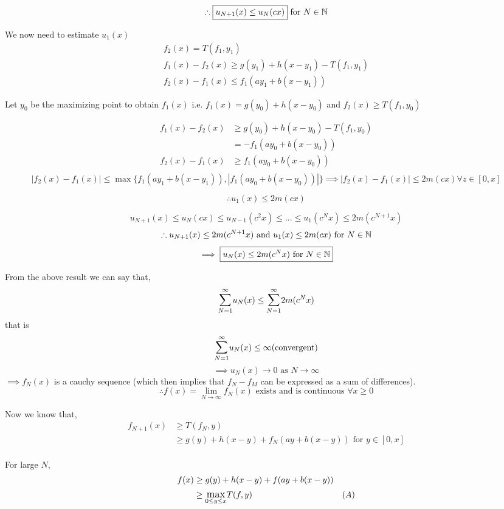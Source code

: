 $$
\therefore \boxed{u_{N+1}(x) \le u_N(cx)} \text{ for } N \in \mathbb{N} 
$$

We now need to estimate $u_1(x)$
\begin{align*}
    f_2(x) = T(f_1, y_1)\\
    f_1(x) - f_2(x) \ge g(y_1) + h(x-y_1) - T(f_1, y_1)\\
    f_2(x) - f_1(x) \le f_1(ay_1 +  b(x-y_1))
\end{align*}

Let $y_0$ be the maximizing point to obtain $f_1(x)$ i.e. $f_1(x) = g(y_0) + h(x-y_0)$ and $f_2(x) \ge T(f_1, y_0)$

\begin{align*}
    f_1(x) - f_2(x) &\ge g(y_0) + h(x-y_0) - T(f_1, y_0)\\
                    &= -f_1(ay_0 +  b(x-y_0))\\
    f_2(x) - f_1(x) &\ge f_1(ay_0 +  b(x-y_0))\\
\end{align*}
\[
    |f_2(x) - f_1(x)| \le \max\{f_1(ay_1 +  b(x-y_1)), |f_1(ay_0 +  b(x-y_0))|\} \implies
    |f_2(x) - f_1(x)| \le 2m(cx) \forall z \in [0, x]
\]

$$\therefore \boxed{u_1(x) \le 2m(cx)}$$

$$
u_{N+1}(x) \le u_N(cx) \le u_{N-1}(c^2x) \le ... \le u_1(c^Nx) \le 2m(c^{N+1}x)
$$
$$
\therefore {u_{N+1}(x) \le 2m(c^{N+1}x) \text{ and } u_1(x) \le 2m(cx)} \text{ for } N \in \mathbb{N}
$$
$$
\implies \boxed{u_N(x) \le 2m(c^{N}x) \text{ for } N \in \mathbb{N}}
$$

From the above result we can say that, 
$$
\bigsum_{N=1}^{\infty} u_N(x) \le \bigsum_{N=1}^{\infty} 2m(c^{N}x)
$$
that is 
$$
\bigsum_{N=1}^{\infty} u_N(x) \le \infty \text{(convergent)}
$$
$$
\implies u_N(x) \rightarrow 0 \text{ as } N \rightarrow \infty
$$
$\implies f_N(x)$ is a cauchy sequence (which then implies that $f_N-f_M$ can be expressed as a sum of differences).
$$
\therefore f(x) = \lim_{N \rightarrow \infty} f_N(x) \text{ exists and is continuous } \forall x \ge 0
$$

\vspace{5mm}

Now we know that, 
\begin{align*}
    f_{N+1}(x) &\ge T(f_N, y)\\
               &\ge g(y) + h(x-y) + f_N(ay+b(x-y)) \text{ for } y \in [0, x]\\
\end{align*}

For large $N$, 
\begin{align*}
    f(x) &\ge g(y) + h(x-y) + f(ay+b(x-y))\\
        &\ge \mathlarger{\max}_{0 \le y \le x} T(f, y) & (A)\\
\end{align*}


